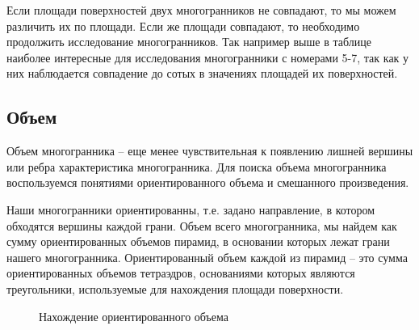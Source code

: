 \documentclass[a4paper,12pt, titlepage]{article}
\begin{document}
Если площади поверхностей двух многогранников не совпадают, то мы можем различить их по площади. Если же площади
совпадают, то необходимо продолжить исследование многогранников. Так например выше в таблице наиболее интересные 
для исследования многогранники с номерами 5-7, так как у них наблюдается совпадение до сотых в значениях площадей
их поверхностей.  
 
\subsection{Объем}
Объем многогранника -- еще менее чувствительная к появлению лишней вершины или ребра характеристика многогранника.
Для поиска объема многогранника  воспользуемся понятиями ориентированного объема и смешанного произведения.

Наши многогранники ориентированны, т.е. задано направление, в котором обходятся вершины каждой грани.
Объем всего многогранника, мы найдем как сумму ориентированных объемов пирамид, в основании которых 
лежат грани нашего многогранника. Ориентированный объем каждой из пирамид -- это сумма ориентированных 
объемов тетраэдров, основаниями которых являются треугольники, используемые для нахождения площади поверхности.

\begin{figure}[h]
\noindent{}
\caption{Нахождение ориентированного объема}
\label{vol}
\end{figure}
\end{document}
